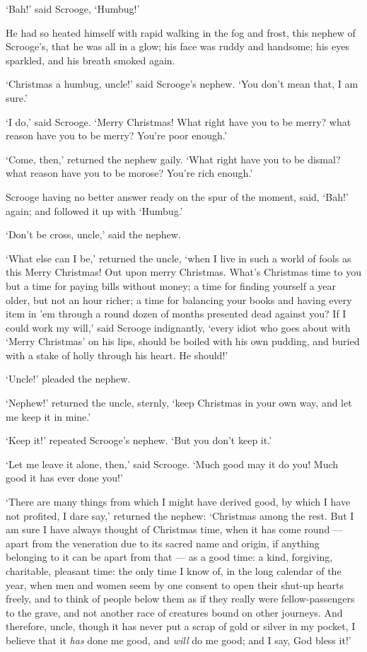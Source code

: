 \documentclass[11pt,twoside]{article}\makeatletter
\begin{document}
‘Bah!’ said Scrooge, ‘Humbug!’  \par
He had so heated himself with rapid walking in the fog and frost, this nephew of Scrooge's, that he was all in a glow; his face was ruddy and handsome; his eyes sparkled, and his breath smoked again.  \par
‘Christmas a humbug, uncle!’ said Scrooge's nephew.  ‘You don't mean that, I am sure.’  \par
‘I do,’ said Scrooge.  ‘Merry Christmas!  What right have you to be merry?  what reason have you to be merry? You're poor enough.’  \par
‘Come, then,’ returned the nephew gaily.  ‘What right have you to be dismal?  what reason have you to be morose? You're rich enough.’  \par
Scrooge having no better answer ready on the spur of the moment, said, ‘Bah!’ again; and followed it up with  ‘Humbug.’  \par
‘Don't be cross, uncle,’ said the nephew.  \par
‘What else can I be,’ returned the uncle, ‘when I live in such a world of fools as this  Merry Christmas!  Out upon merry Christmas.  What's Christmas time to you but a time for  paying bills without money; a time for finding yourself a year older, but not an hour richer; a time for balancing your books and having every item in 'em through a round dozen of months presented dead against you?  If I could work my will,’ said Scrooge indignantly, ‘every idiot who goes about with ‘Merry Christmas’ on his lips, should be boiled with his own pudding, and buried with a stake of holly through his heart.  He should!’  \par
‘Uncle!’ pleaded the nephew.  \par
‘Nephew!’ returned the uncle, sternly, ‘keep Christmas in your own way, and let me keep it in mine.’  \par
‘Keep it!’ repeated Scrooge's nephew.  ‘But you don't keep it.’  \par
‘Let me leave it alone, then,’ said Scrooge.  ‘Much good may it do you!  Much good it has ever done you!’  \par
‘There are many things from which I might have derived good, by which I have not profited, I dare say,’ returned the nephew:  ‘Christmas among the rest.  But I am sure I have always thought of Christmas time, when it has come round  — apart from the veneration due to its sacred name and origin, if anything belonging to it can be apart from that — as a good time: a kind, forgiving, charitable, pleasant time: the only time I know of, in the long calendar of the year, when men and women seem by one consent to open their shut-up hearts freely, and to think of people below them as if they really were fellow-passengers to the grave, and not another race of creatures bound on other journeys.  And therefore, uncle, though it has never put a scrap of gold or silver in my pocket, I believe that it \textit{has} done me good, and \textit{will} do me good; and I say, God bless it!’  \par
\end{document}
